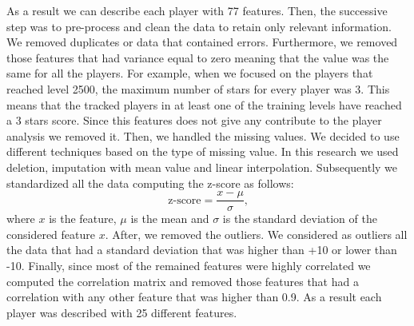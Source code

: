 As a result we can describe each player with 77 features. Then, the successive step was to pre-process and clean the data to retain only relevant information. We removed duplicates or data that contained errors. Furthermore, we removed those features that had variance equal to zero meaning that the value was the same for all the players. For example, when we focused on the players that reached level 2500, the maximum number of stars for every player was 3. This means that the tracked players in at least one of the training levels have reached a 3 stars score. Since this features does not give any contribute to the player analysis we removed it.
Then, we handled the missing values. We decided to use different techniques based on the type of missing value. In this research we used deletion, imputation with mean value and linear interpolation. Subsequently we standardized all the data computing the z-score as follows: 
\begin{equation}
    \text{z-score} = \frac{x - \mu}{\sigma} \text{,}
\end{equation}
where $x$ is the feature, $\mu$ is the mean and $\sigma$ is the standard deviation of the considered feature $x$. After, we removed the outliers. We considered as outliers all the data that had a standard deviation that was higher than +10 or lower than -10. Finally, since most of the remained features were highly correlated we computed the correlation matrix and removed those features that had a correlation with any other feature that was higher than 0.9. As a result each player was described with 25 different features. 

